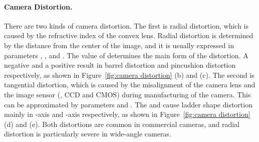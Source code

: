     \paragraph{Camera Distortion.}
        There are two kinds of camera distortion. The first is radial distortion, which is caused by the refractive index of the convex lens. Radial distortion is determined by the distance from the center of the image, and it is usually expressed in parameters , , and . The value of  determines the main form of the distortion. A negative  and a positive  result in barrel distortion and pincushion distortion respectively, as shown in Figure~\ref{fig:camera distortion} (b) and (c). The second is tangential distortion, which is caused by the misalignment of the camera lens and the image sensor (\eg, CCD and CMOS) during manufacturing of the camera. This can be approximated by parameters  and . The  and  cause ladder shape distortion mainly in -axis and -axis respectively, as shown in Figure~\ref{fig:camera distortion} (d) and (e). Both distortions are common in commercial cameras, and radial distortion is particularly severe in wide-angle cameras.

